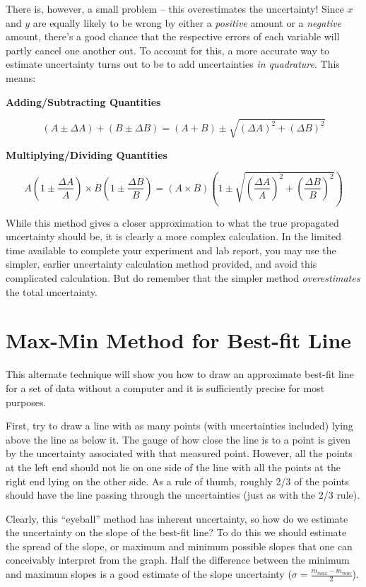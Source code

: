 \documentclass[letterpaper, 12pt]{book}
\newcommand{\myskip}{\vspace{0.5\baselineskip}}
\begin{document}
There is, however, a small problem -- this overestimates the uncertainty!  Since $x$ and $y$ are equally likely to be wrong by either a \emph{positive} amount or a \emph{negative} amount, there's a good chance that the respective errors of each variable will partly cancel one another out.  To account for this, a more accurate way to estimate uncertainty turns out to be to add uncertainties \emph{in quadrature}.  This means:\myskip

\textbf{Adding/Subtracting Quantities}

\begin{equation}
    (A\pm\Delta A) + (B\pm\Delta B) = (A+B)\pm\sqrt{(\Delta A)^2+(\Delta B)^2}
\end{equation}

\myskip\textbf{Multiplying/Dividing Quantities}

\begin{equation}
    A\left(1\pm\frac{\Delta A}{A}\right) \times B\left(1\pm\frac{\Delta B}{B}\right) = \left(A \times B\right) \left ( 1 \pm\sqrt{\left(\frac{\Delta A}{A}\right)^2+\left(\frac{\Delta B}{B}\right)^2} \right )
\end{equation}

While this method gives a closer approximation to what the true propagated uncertainty should be, it is clearly a more complex calculation.  In the limited time available to complete your experiment and lab report, you may use the simpler, earlier uncertainty calculation method provided, and avoid this complicated calculation.  But do remember that the simpler method \emph{overestimates} the total uncertainty.

\section{Max-Min Method for Best-fit Line}

This alternate technique will show you how to draw an approximate best-fit line for a  set of data without a computer and it is sufficiently precise for most purposes.

First, try to draw a line with as many points (with uncertainties included) lying above the line as below it. The gauge of how close the line is to a point is given by the uncertainty associated with that measured point. However, all the points at the left end should not lie on one side of the line with all the points at the right end lying on the other side. As a rule of thumb, roughly 2/3 of the points should have the line passing through the uncertainties (just as with the 2/3 rule).\myskip

Clearly, this ``eyeball'' method has inherent uncertainty, so how do we estimate the uncertainty on the slope of the best-fit line? To do this we should estimate the spread of the slope, or maximum and minimum possible slopes that one can conceivably interpret from the graph. Half the difference between the minimum and maximum slopes is a good estimate of the slope uncertainty ($\sigma=\frac{m_{max}-m_{min}}{2}$).
\end{document}
